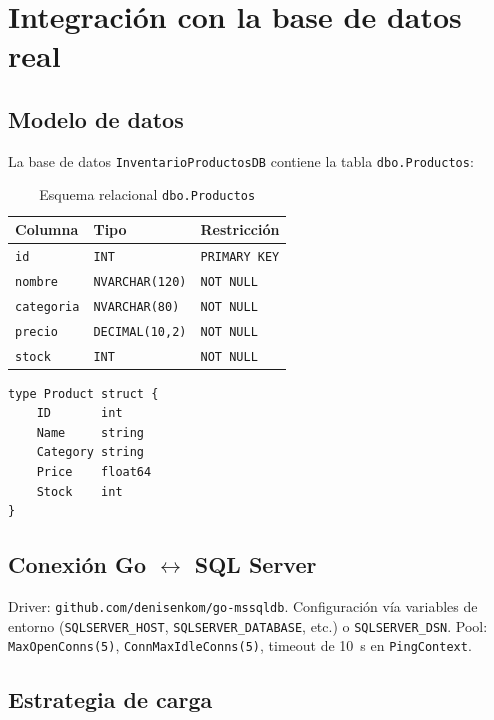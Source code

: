 \chapter{Integración con la base de datos real}

\section{Modelo de datos}

La base de datos \texttt{InventarioProductosDB} contiene la tabla \texttt{dbo.Productos}:

\begin{table}[H]
  \centering
  \caption{Esquema relacional \texttt{dbo.Productos}}
  \begin{tabular}{@{}lll@{}}
    \toprule
    \textbf{Columna} & \textbf{Tipo} & \textbf{Restricción} \\
    \midrule
    \texttt{id} & \texttt{INT} & \texttt{PRIMARY KEY} \\
    \texttt{nombre} & \texttt{NVARCHAR(120)} & \texttt{NOT NULL} \\
    \texttt{categoria} & \texttt{NVARCHAR(80)} & \texttt{NOT NULL} \\
    \texttt{precio} & \texttt{DECIMAL(10,2)} & \texttt{NOT NULL} \\
    \texttt{stock} & \texttt{INT} & \texttt{NOT NULL} \\
    \bottomrule
  \end{tabular}
\end{table}

\begin{lstlisting}[style=gocode,caption={Struct Go \texttt{Product}},label={lst:product}]
type Product struct {
    ID       int
    Name     string
    Category string
    Price    float64
    Stock    int
}
\end{lstlisting}

\section{Conexión Go $\leftrightarrow$ SQL Server}

Driver: \texttt{github.com/denisenkom/go-mssqldb}. Configuración vía variables de entorno (\texttt{SQLSERVER\_HOST}, \texttt{SQLSERVER\_DATABASE}, etc.) o \texttt{SQLSERVER\_DSN}. Pool: \texttt{MaxOpenConns(5)}, \texttt{ConnMaxIdleConns(5)}, timeout de 10~s en \texttt{PingContext}.

\section{Estrategia de carga}


